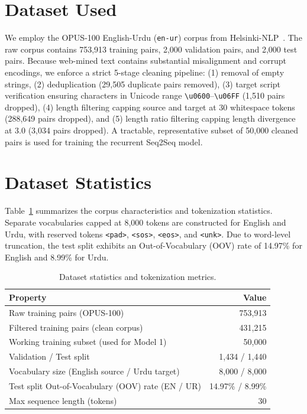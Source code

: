 \documentclass[conference]{IEEEtran}
\begin{document}
\section{Dataset Used}
We employ the OPUS-100 English-Urdu (\texttt{en-ur}) corpus from Helsinki-NLP~\cite{tiedemann2012}. The raw corpus contains 753,913 training pairs, 2,000 validation pairs, and 2,000 test pairs. Because web-mined text contains substantial misalignment and corrupt encodings, we enforce a strict 5-stage cleaning pipeline: (1) removal of empty strings, (2) deduplication (29,505 duplicate pairs removed), (3) target script verification ensuring characters in Unicode range \texttt{\textbackslash u0600}--\texttt{\textbackslash u06FF} (1,510 pairs dropped), (4) length filtering capping source and target at 30 whitespace tokens (288,649 pairs dropped), and (5) length ratio filtering capping length divergence at 3.0 (3,034 pairs dropped). A tractable, representative subset of 50,000 cleaned pairs is used for training the recurrent Seq2Seq model.

\section{Dataset Statistics}
Table~\ref{tab:dataset_stats} summarizes the corpus characteristics and tokenization statistics. Separate vocabularies capped at 8,000 tokens are constructed for English and Urdu, with reserved tokens \texttt{<pad>}, \texttt{<sos>}, \texttt{<eos>}, and \texttt{<unk>}. Due to word-level truncation, the test split exhibits an Out-of-Vocabulary (OOV) rate of 14.97\% for English and 8.99\% for Urdu.

\begin{table}[htbp]
\caption{Dataset statistics and tokenization metrics.}
\label{tab:dataset_stats}
\centering
\begin{tabular}{lr}
\toprule
\textbf{Property} & \textbf{Value} \\
\midrule
Raw training pairs (OPUS-100) & 753,913 \\
Filtered training pairs (clean corpus) & 431,215 \\
Working training subset (used for Model 1) & 50,000 \\
Validation / Test split & 1,434 / 1,440 \\
Vocabulary size (English source / Urdu target) & 8,000 / 8,000 \\
Test split Out-of-Vocabulary (OOV) rate (EN / UR) & 14.97\% / 8.99\% \\
Max sequence length (tokens) & 30 \\
\bottomrule
\end{tabular}
\end{table}
\end{document}
